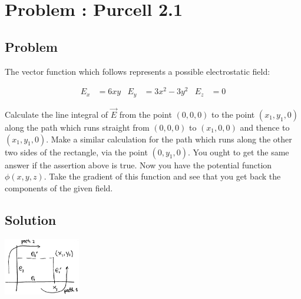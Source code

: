 \documentclass[solutions]{esg8022pset}
\begin{document}
\section{Problem \thesection: Purcell 2.1}
\subsection{Problem}
  The vector function which follows represents a possible electrostatic field:

  \begin{align*}
    E_x & = 6xy &
      E_y & = 3x^2 - 3y^2 &
        E_z & = 0
  \end{align*}

  Calculate the line integral of $\vec E$ from the point $(0, 0, 0)$ to the point $(x_1, y_1, 0)$ along the path which runs straight from $(0, 0, 0)$ to $(x_1, 0, 0)$ and thence to $(x_1, y_1, 0)$. Make a similar calculation for the path which runs along the other two sides of the rectangle, via the point $(0, y_1, 0)$. You ought to get the same answer if the assertion above is true. Now you have the potential function $\phi(x, y, z)$. Take the gradient of this function and see that you get back the components of the given field.
\subsection{Solution}
  \begin{center}\includegraphics[width=0.25\textwidth]{ps02_sol_04}\end{center}
\end{document}
